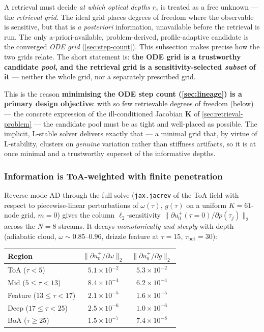 \documentclass[11pt,a4paper]{article}
\newcommand{\mat}[1]{\mathbf{#1}}
\newcommand{\tbot}{\tau_{\mathrm{bot}}}
\theoremstyle{definition}
\begin{document}
A retrieval must decide \emph{at which optical depths} $r_e$ is treated
as a free unknown --- the \emph{retrieval grid}.  The ideal grid places
degrees of freedom where the observable is sensitive, but that is
\emph{a posteriori} information, unavailable before the retrieval is run.
The only a-priori-available, problem-derived, profile-adaptive candidate
is the converged \emph{ODE grid} (\cref{sec:step-count}).  This
subsection makes precise how the two grids relate.  The short statement
is: \textbf{the ODE grid is a trustworthy candidate \emph{pool}, and the
retrieval grid is a sensitivity-selected \emph{subset} of it} --- neither
the whole grid, nor a separately prescribed grid.

This is the reason \textbf{minimising the ODE step count
(\cref{sec:lineage}) is a primary design objective}: with so few
retrievable degrees of freedom (below) --- the concrete expression of
the ill-conditioned Jacobian $\mat{K}$ of \cref{sec:retrieval-problem}
--- the candidate pool must be as tight and well-placed as possible.  The implicit, L-stable solver
delivers exactly that --- a minimal grid that, by virtue of L-stability,
clusters on \emph{genuine} variation rather than stiffness artifacts, so
it is at once minimal and a trustworthy superset of the informative
depths.

\subsubsection{Information is ToA-weighted with finite penetration}

Reverse-mode AD through the full solve (\texttt{jax.jacrev} of the ToA
field with respect to piecewise-linear perturbations of $\omega(\tau)$,
$g(\tau)$ on a uniform $K=61$-node grid, $m=0$) gives the column
$\ell_2$-sensitivity $\lVert \partial u^+_0(\tau{=}0)/\partial
p(\tau_j)\rVert_2$ across the $N=8$ streams.  It decays
\emph{monotonically and steeply} with depth (adiabatic cloud,
$\omega\!\sim\!0.85$--$0.96$, drizzle feature at $\tau{=}15$,
$\tbot{=}30$):

\begin{center}
\begin{tabular}{l c c}
\toprule
Region & $\lVert\partial u^+_0/\partial\omega\rVert_2$
       & $\lVert\partial u^+_0/\partial g\rVert_2$\\
\midrule
ToA ($\tau<5$)               & $5.1\times10^{-2}$ & $5.3\times10^{-2}$\\
Mid ($5\!\leq\!\tau\!<\!13$)  & $8.4\times10^{-4}$ & $6.2\times10^{-4}$\\
Feature ($13\!\leq\!\tau\!<\!17$) & $2.1\times10^{-5}$ & $1.6\times10^{-5}$\\
Deep ($17\!\leq\!\tau\!<\!25$)    & $2.5\times10^{-6}$ & $1.0\times10^{-6}$\\
BoA ($\tau\geq 25$)          & $1.5\times10^{-7}$ & $7.4\times10^{-8}$\\
\bottomrule
\end{tabular}
\end{center}
\end{document}
